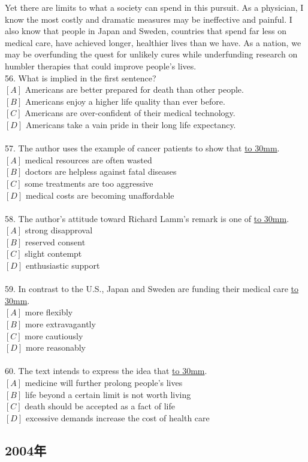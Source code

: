 \documentclass[a4paper]{article}
\begin{document}
\par
Yet there are limits to what a society can spend in this pursuit. As a physician, I know the most costly and dramatic measures may be ineffective and painful. I also know that people in Japan and Sweden, countries that spend far less on medical care, have achieved longer, healthier lives than we have. As a nation, we may be overfunding the quest for unlikely cures while underfunding research on humbler therapies that could improve people’s lives.
\\56.	What is implied in the first sentence?\\$[A]$ Americans are better prepared for death than other people.\\$[B]$ Americans enjoy a higher life quality than ever before.\\$[C]$ Americans are over-confident of their medical technology.\\$[D]$ Americans take a vain pride in their long life expectancy.\\\\57.	The author uses the example of cancer patients to show that \underline{\hbox to 30mm{}}.\\$[A]$ medical resources are often wasted\\$[B]$ doctors are helpless against fatal diseases\\$[C]$ some treatments are too aggressive\\$[D]$ medical costs are becoming unaffordable\\\\58.	The author’s attitude toward Richard Lamm’s remark is one of \underline{\hbox to 30mm{}}.\\$[A]$ strong disapproval\\$[B]$ reserved consent\\$[C]$ slight contempt\\$[D]$ enthusiastic support\\\\59.	In contrast to the U.S., Japan and Sweden are funding their medical care \underline{\hbox to 30mm{}}.\\$[A]$ more flexibly\\$[B]$ more extravagantly\\$[C]$ more cautiously\\$[D]$ more reasonably\\\\60.	The text intends to express the idea that \underline{\hbox to 30mm{}}.\\$[A]$ medicine will further prolong people’s lives\\$[B]$ life beyond a certain limit is not worth living\\$[C]$ death should be accepted as a fact of life\\$[D]$ excessive demands increase the cost of health care\\\subsection{2004年}
\end{document}
